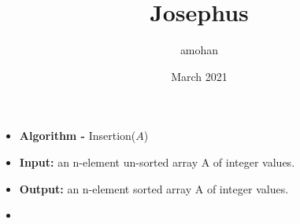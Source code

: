 \documentclass{article}
\title{Josephus}
\author{amohan }
\date{March 2021}
\begin{document}
\begin{itemize}
\item[]
\footnotesize{\textbf{Algorithm - }Insertion($A$)}\\
\item[]
\footnotesize{\textbf{Input:} an n-element un-sorted array A of integer values.}
\item[]
\footnotesize{\textbf{Output:} an n-element sorted array A of integer values.} 

\item[]
\end{itemize}
\end{document}
